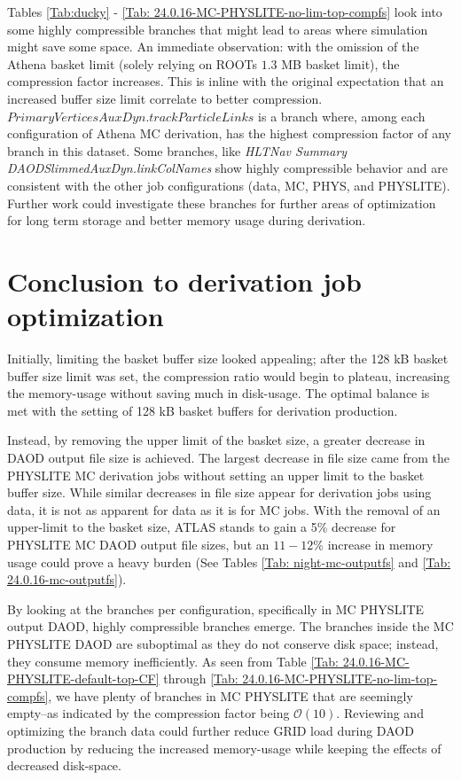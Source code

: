 Tables \ref{Tab:ducky} - \ref{Tab: 24.0.16-MC-PHYSLITE-no-lim-top-compfs} look into some highly compressible branches that might lead to areas where simulation might save some space. 
An immediate observation: with the omission of the Athena basket limit (solely relying on ROOTs $1.3$ MB basket limit), the compression factor increases. 
This is inline with the original expectation that an increased buffer size limit correlate to better compression. 
$\textit{PrimaryVerticesAuxDyn.trackParticleLinks}$ is a branch where, among each configuration of Athena MC derivation, has the highest compression factor of any branch in this dataset. 
Some branches, like \textit{HLTNav Summary DAODSlimmedAuxDyn.linkColNames} show highly compressible behavior and are consistent with the other job configurations (data, MC, PHYS, and PHYSLITE). 
Further work could investigate these branches for further areas of optimization for long term storage and better memory usage during derivation.

\section{Conclusion to derivation job optimization}
\label{sec:DAODProd_Results_conclusion}

Initially, limiting the basket buffer size looked appealing; after the 128 kB basket buffer size limit was set, the compression ratio would begin to plateau, increasing the memory-usage without saving much in disk-usage. 
The optimal balance is met with the setting of 128 kB basket buffers for derivation production. 

Instead, by removing the upper limit of the basket size, a greater decrease in DAOD output file size is achieved. 
The largest decrease in file size came from the PHYSLITE MC derivation jobs without setting an upper limit to the basket buffer size. 
While similar decreases in file size appear for derivation jobs using data, it is not as apparent for data as it is for MC jobs. 
With the removal of an upper-limit to the basket size, ATLAS stands to gain a 5\% decrease for PHYSLITE MC DAOD output file sizes, but an $11 - 12$\% increase in memory usage could prove a heavy burden (See Tables \ref{Tab: night-mc-outputfs} and \ref{Tab: 24.0.16-mc-outputfs}).

By looking at the branches per configuration, specifically in MC PHYSLITE output DAOD, highly compressible branches emerge. 
The branches inside the MC PHYSLITE DAOD are suboptimal as they do not conserve disk space; instead, they consume memory inefficiently. 
As seen from Table \ref{Tab: 24.0.16-MC-PHYSLITE-default-top-CF} through \ref{Tab: 24.0.16-MC-PHYSLITE-no-lim-top-compfs}, we have plenty of branches in MC PHYSLITE that are seemingly empty--as indicated by the compression factor being $\mathcal{O}(10)$. 
Reviewing and optimizing the branch data could further reduce GRID load during DAOD production by reducing the increased memory-usage while keeping the effects of decreased disk-space. 
